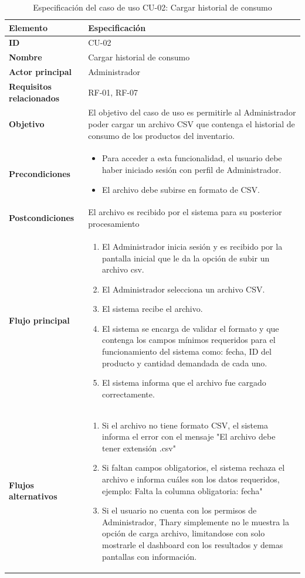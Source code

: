 \begin{table}[H]
\centering
\caption{Especificación del caso de uso CU-02: Cargar historial de consumo}
\label{tab:cu02_cargar_historial}
\renewcommand{\arraystretch}{1.3}
\begin{tabularx}{\textwidth}{|>{\bfseries}p{3.5cm}|X|}
\hline
Elemento & Especificación \\
\hline
ID & CU-02 \\
\hline
Nombre & Cargar historial de consumo \\
\hline
Actor principal & Administrador \\
\hline
Requisitos relacionados & RF-01, RF-07 \\
\hline
Objetivo & El objetivo del caso de uso es permitirle al Administrador poder cargar un archivo CSV que contenga el historial de consumo de los productos del inventario. \\
\hline
Precondiciones &
\begin{itemize}
    \item Para acceder a esta funcionalidad, el usuario debe haber iniciado sesión con perfil de Administrador.
    \item El archivo debe subirse en formato de CSV.
\end{itemize} \\
\hline
Postcondiciones & El archivo es recibido por el sistema para su posterior procesamiento \\
\hline
Flujo principal &
\begin{enumerate}
    \item El Administrador inicia sesión y es recibido por la pantalla inicial que le da la opción de subir un archivo csv.
    \item El Administrador selecciona un archivo CSV.
    \item El sistema recibe el archivo.
    \item El sistema se encarga de validar el formato y que contenga los campos mínimos requeridos para el funcionamiento del sistema como: fecha, ID del producto y cantidad demandada de cada uno.
    \item El sistema informa que el archivo fue cargado correctamente.
\end{enumerate} \\
\hline
Flujos alternativos &
\begin{enumerate}
    \item Si el archivo no tiene formato CSV, el sistema informa el error con el mensaje "El archivo debe tener extensión .csv"
    \item Si faltan campos obligatorios, el sistema rechaza el archivo e informa cuáles son los datos requeridos, ejemplo: Falta la columna obligatoria: fecha"
    \item Si el usuario no cuenta con los permisos de Administrador, Thary simplemente no le muestra la opción de carga archivo, limitandose con solo mostrarle el dashboard con los resultados y demas pantallas con información.
\end{enumerate} \\
\hline
\end{tabularx}
\end{table}

